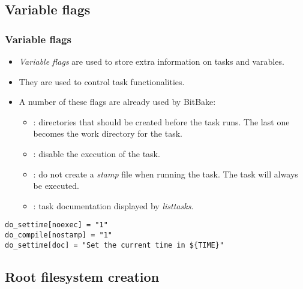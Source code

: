 \subsection{Variable flags}

\begin{frame}[fragile]
  \frametitle{Variable flags}
  \begin{itemize}
    \item {\em Variable flags} are used to store extra information on
      tasks and varables.
    \item They are used to control task functionalities.
    \item A number of these flags are already used by BitBake:
      \begin{itemize}
        \item {}: directories that should be created before the
          task runs. The last one becomes the work directory for the
          task.
        \item {}: disable the execution of the task.
        \item {}: do not create a {\em stamp} file when
          running the task. The task will always be executed.
        \item {}: task documentation displayed by {\em
          listtasks}.
      \end{itemize}
  \end{itemize}
  \begin{verbatim}
do_settime[noexec] = "1"
do_compile[nostamp] = "1"
do_settime[doc] = "Set the current time in ${TIME}"
  \end{verbatim}
\end{frame}

\subsection{Root filesystem creation}

